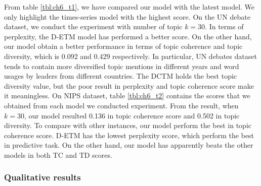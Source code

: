 From table \ref{tbl:ch6_t1}, we have compared our model with the latest model. We only highlight the times-series model with the highest score. 
On the UN debate dataset, we conduct the experiment with number of topic $ k=30 $. In terms of perplexity, the D-ETM model has performed a better score. On the other hand, our model obtain a better performance in terms of topic coherence and topic diversity, which is 0.092 and 0.429 respectively. In particular, UN debates dataset tends to contain more diversified topic mentions in different years and word usages by leaders from different countries. 
The DCTM holds the best topic diversity value, but the poor result in perplexity and topic coherence score make it meaningless.
On NIPS dataset, table \ref{tbl:ch6_t2} contains the scores that we obtained from each model we conducted experiment. From the result, when $ k=30 $, our model resulted 0.136 in topic coherence score and 0.502 in topic diversity. To compare with other instances, our model perform the best in topic coherence score. D-ETM has the lowest perplexity score, which perform the best in predictive task. On the other hand, our model has apparently beats the other models in both TC and TD scores. 
\subsubsection{Qualitative results}

